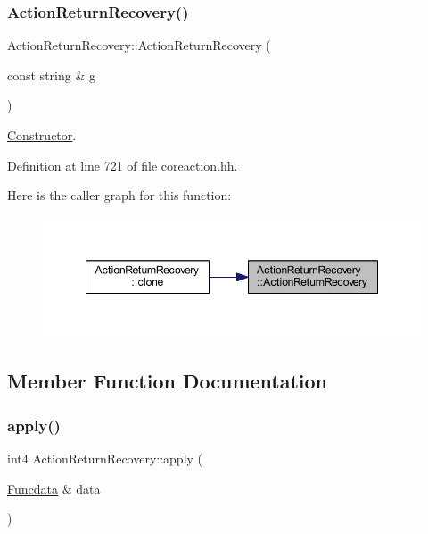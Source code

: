 \subsubsection{\texorpdfstring{ActionReturnRecovery()}{ActionReturnRecovery()}}
{\footnotesize\ttfamily Action\+Return\+Recovery\+::\+Action\+Return\+Recovery (\begin{DoxyParamCaption}\item[{const string \&}]{g }\end{DoxyParamCaption})\hspace{0.3cm}{\ttfamily [inline]}}



\mbox{\hyperlink{class_constructor}{Constructor}}. 



Definition at line 721 of file coreaction.\+hh.

Here is the caller graph for this function\+:
\nopagebreak
\begin{figure}[H]
\begin{center}
\leavevmode
\includegraphics[width=348pt]{class_action_return_recovery_a01d08c23135a3e1a7352803003308b65_icgraph}
\end{center}
\end{figure}


\subsection{Member Function Documentation}
\mbox{\label{class_action_return_recovery_aaad5058cd2347ea61be24b63f8b17d60}} 
\subsubsection{\texorpdfstring{apply()}{apply()}}
{\footnotesize\ttfamily int4 Action\+Return\+Recovery\+::apply (\begin{DoxyParamCaption}\item[{\mbox{\hyperlink{class_funcdata}{Funcdata}} \&}]{data }\end{DoxyParamCaption})\hspace{0.3cm}{\ttfamily [virtual]}}



